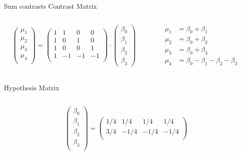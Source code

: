 \documentclass[aspectratio=169]{beamer}
\begin{document}
\begin{frame}{Sum contrasts}
  \footnotesize
  Contrast Matrix
  \begin{columns}
    \begin{column}[t]{.5\textwidth}
\[
  \begin{pmatrix}
    \mu_1 \\
    \mu_2 \\
    \mu_3 \\
    \mu_4 \\
  \end{pmatrix} = 
  \begin{pmatrix}
    1 & 1 & 0 & 0 \\ 
    1 & 0 & 1 & 0 \\ 
    1 & 0 & 0 & 1 \\ 
    1 & -1 & -1 & -1 \\ 
  \end{pmatrix} \cdot
  \begin{pmatrix}
    \beta_0 \\
    \beta_1 \\
    \beta_2 \\
    \beta_3
  \end{pmatrix}
\]
    \end{column}
    \begin{column}[t]{.5\textwidth}
\begin{align*}
  \mu_1 & = \beta_0 + \beta_1 \\
  \mu_2 & = \beta_0 + \beta_2 \\
  \mu_3 & = \beta_0 + \beta_3 \\
  \mu_4 & = \beta_0 - \beta_1 - \beta_2 - \beta_3 \\
\end{align*}
    \end{column}
  \end{columns}
  \vspace{-1.2cm}
  Hypothesis Matrix
  \begin{columns}
    \begin{column}[t]{.5\textwidth}
\[
  \begin{pmatrix}
    \beta_0 \\
    \beta_1 \\
    \beta_2 \\
    \beta_3 \\
  \end{pmatrix} = 
  \begin{pmatrix}
     1/4 &  1/4 &  1/4 &  1/4 \\ 
     3/4 & -1/4 & -1/4 & -1/4 \\ 

\end{pmatrix}\]
\end{column}
\end{columns}
\end{frame}
\end{document}
